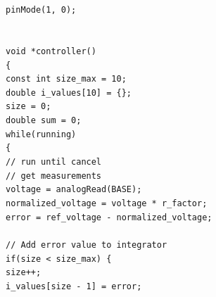 \documentclass[a4paper, 12pt]{article}
\begin{document}
\begin{appendices}
	\texttt{\hspace*{1em}pinMode(1, 0);} \\\noindent
	\texttt{\hspace*{1em}}\\\noindent
        \texttt{ \\\noindent}
        \texttt{void *controller()} \\\noindent
        \texttt{\{ \\\noindent}
	\texttt{\hspace*{1em}const int size\_max = 10;} \\\noindent
	\texttt{\hspace*{1em}double i\_values[10] = \{\};} \\\noindent
	\texttt{\hspace*{1em}size = 0;} \\\noindent
	\texttt{\hspace*{1em}double sum = 0;} \\\noindent
	\texttt{\hspace*{1em}while(running)} \\\noindent
	\texttt{\hspace*{2em}\{ \\\noindent}
	\texttt{\hspace*{2em}// run until cancel} \\\noindent
	\texttt{\hspace*{2em}// get measurements} \\\noindent
	\texttt{\hspace*{2em}voltage = analogRead(BASE);} \\\noindent
	\texttt{\hspace*{2em}normalized\_voltage = voltage * r\_factor;} \\\noindent
	\texttt{\hspace*{2em}error = ref\_voltage - normalized\_voltage;} \\\noindent
	\texttt{\hspace*{2em}\\\noindent}
	\texttt{\hspace*{2em}// Add error value to integrator} \\\noindent
	\texttt{\hspace*{2em}if(size < size\_max) \{ \\\noindent}
	\texttt{\hspace*{3em}size++;} \\\noindent
	\texttt{\hspace*{3em}i\_values[size - 1] = error;} \\\noindent

\end{appendices}
\end{document}
